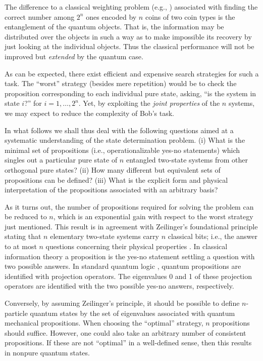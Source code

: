 The difference to a classical weighting problem (e.g.,  \cite{smith47,cairns63}) associated
with finding the correct number among $2^n$ ones encoded by $n$ coins of two coin types
is the entanglement of the quantum objects.
That is, the information may be distributed over the objects in such a way as to
make impossible its recovery by just looking at the individual objects.
Thus the classical performance will not be improved but
{\em extended} by the quantum case.

As can be expected, there exist efficient and expensive
search strategies for such a task.
The ``worst'' strategy (besides mere repetition)
would be to check the proposition corresponding to each individual pure state,
asking, ``is the system in state $i$?'' for $i=1,\ldots ,2^n$.
Yet, by exploiting the {\em joint properties} of the $n$ systems,
we may expect to reduce the complexity of Bob's task.

In what follows we shall thus deal with the following questions
aimed at a systematic understanding of the state determination problem.
(i) What is the minimal set of propositions (i.e., operationalizable yes-no statements)
which singles out a  particular
pure state of $n$ entangled two-state systems from other orthogonal pure states?
(ii) How many different but equivalent sets of propositions can be defined?
(iii) What is the explicit form and physical interpretation of the propositions associated with an arbitrary basis?

As it turns out, the number of propositions required for solving the   problem
can be reduced to $n$, which is an exponential gain with respect to
the worst strategy just mentioned.
This result is in agreement with
Zeilinger's foundational principle stating that
$n$ elementary two-state systems carry $n$ classical bits; i.e., the answer to
at most $n$ questions concerning their physical properties \cite{zeil-99}.
In classical information theory a proposition is the yes-no
statement settling a question with two possible answers.
In standard quantum logic  \cite{birkhoff-36,ma-57,kochen1,svozil-ql},
quantum propositions are identified with projection operators.
The eigenvalues 0 and 1 of these projection operators
are identified with the two possible yes-no answers, respectively.


Conversely, by assuming Zeilinger's principle,
it should be possible to define $n$-particle quantum states by
the set of eigenvalues associated with quantum mechanical propositions.
When choosing the ``optimal'' strategy, $n$ propositions should suffice.
However, one could also take an arbitrary number of consistent propositions.
If these are not ``optimal'' in a well-defined sense,
then this results in nonpure quantum states.


